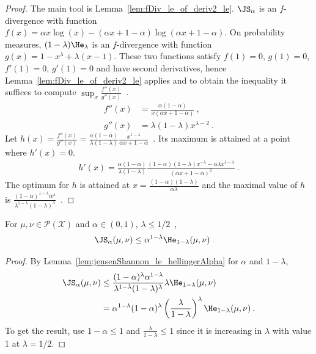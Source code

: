 \begin{proof}%
{}
The main tool is Lemma~\ref{lem:fDiv_le_of_deriv2_le}.
$\JS_\alpha$ is an $f$-divergence with function $f(x) = \alpha x \log(x) - (\alpha x + 1 - \alpha) \log (\alpha x + 1 - \alpha)$. On probability measures, $(1 - \lambda)\He_\lambda$ is an $f$-divergence with function $g(x) = 1 - x^\lambda + \lambda(x-1)$.
These two functions satisfy $f(1) = 0$, $g(1) = 0$, $f'(1) = 0$, $g'(1) = 0$ and have second derivatives, hence Lemma~\ref{lem:fDiv_le_of_deriv2_le} applies and to obtain the inequality it suffices to compute $\sup_x\frac{f''(x)}{g''(x)}$~.
\begin{align*}
f''(x)
&= \frac{\alpha(1 - \alpha)}{x(\alpha x + 1 - \alpha)}
\: , \\
g''(x)
&= \lambda (1 - \lambda) x^{\lambda - 2}
\: .
\end{align*}
Let $h(x) = \frac{f''(x)}{g''(x)} = \frac{\alpha (1 - \alpha)}{\lambda (1 - \lambda)} \frac{x^{1 - \lambda}}{\alpha x + 1 - \alpha}$~. Its maximum is attained at a point where $h'(x) = 0$.
\begin{align*}
h'(x) = \frac{\alpha (1 - \alpha)}{\lambda (1 - \lambda)} \frac{(1 - \alpha)(1 - \lambda)x^{-\lambda} - \alpha \lambda x^{1 - \lambda}}{(\alpha x + 1 - \alpha)^2}
\: .
\end{align*}
The optimum for $h$ is attained at $x = \frac{(1 - \alpha)(1 - \lambda)}{\alpha \lambda}$ and the maximal value of $h$ is $\frac{(1 - \alpha)^{1 - \lambda} \alpha^\lambda}{\lambda^{1 - \lambda} (1 - \lambda)^\lambda}$~.
\end{proof}


\begin{corollary}
  \label{cor:jensenShannon_le_hellingerAlpha_of_le_half}
  For $\mu, \nu \in \mathcal P(\mathcal X)$ and $\alpha \in (0,1)$, $\lambda \le 1/2$~,
  \begin{align*}
  \JS_\alpha(\mu, \nu)
  &\le \alpha^{1 - \lambda} \He_{1 - \lambda}(\mu, \nu)
  \: .
  \end{align*}
\end{corollary}

\begin{proof}%
{}
By Lemma~\ref{lem:jensenShannon_le_hellingerAlpha} for $\alpha$ and $1 - \lambda$,
\begin{align*}
\JS_\alpha(\mu, \nu)
&\le \frac{(1 - \alpha)^{\lambda} \alpha^{1 - \lambda}}{\lambda^{1 - \lambda} (1 - \lambda)^\lambda} \lambda \He_{1 - \lambda}(\mu, \nu)
\\
&= \alpha^{1 - \lambda} (1 - \alpha)^\lambda \left(\frac{\lambda}{1 - \lambda}\right)^\lambda \He_{1 - \lambda}(\mu, \nu)
\: .
\end{align*}
To get the result, use $1 - \alpha \le 1$ and $\frac{\lambda}{1 - \lambda} \le 1$ since it is increasing in $\lambda$ with value 1 at $\lambda = 1/2$.

\end{proof}

